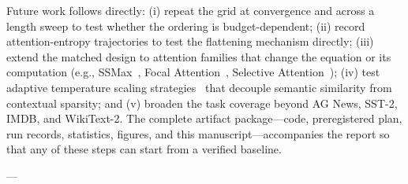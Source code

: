 \documentclass[10pt,a4paper]{article}
\begin{document}
Future work follows directly: (i) repeat the grid at convergence and across a length sweep to test whether the ordering is budget-dependent; (ii) record attention-entropy trajectories to test the flattening mechanism directly; (iii) extend the matched design to attention families that change the equation or its computation (e.g., SSMax~\cite{nakanishi2025scalable}, Focal Attention~\cite{ram2025focal}, Selective Attention~\cite{zhang2024selective}); (iv) test adaptive temperature scaling strategies~\cite{zhang2024selective,ram2025focal,chi2024attention,su2025softplus} that decouple semantic similarity from contextual sparsity; and (v) broaden the task coverage beyond AG News, SST-2, IMDB, and WikiText-2. The complete artifact package---code, preregistered plan, run records, statistics, figures, and this manuscript---accompanies the report so that any of these steps can start from a verified baseline.

---



\end{document}
